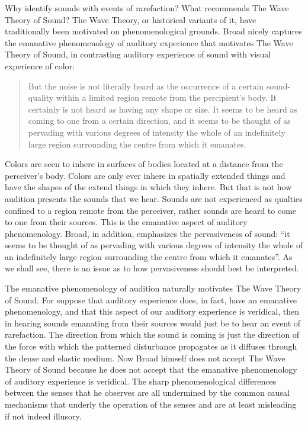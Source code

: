 \documentclass[12pt]{article}
\begin{document}
Why identify sounds with events of rarefaction? What recommends The Wave Theory of Sound? The Wave Theory, or historical variants of it, have traditionally been motivated on phenomenological grounds. Broad nicely captures the emanative phenomenology of auditory experience that motivates The Wave Theory of Sound, in contrasting auditory experience of sound with visual experience of color:
\begin{quote}
	But the noise is not literally heard as the occurrence of a certain sound-quality within a limited region remote from the percipient's body. It certainly is not heard as having any shape or size. It seems to be heard as coming to one from a certain direction, and it seems to be thought of as pervading with various degrees of intensity the whole of an indefinitely large region surrounding the centre from which it emanates. \citep[5]{Broad:1952kx}
\end{quote}
Colors are seen to inhere in surfaces of bodies located at a distance from the perceiver's body. Colors are only ever inhere in spatially extended things and have the shapes of the extend things in which they inhere. But that is not how audition presents the sounds that we hear. Sounds are not experienced as qualties confined to a region remote from the perceiver, rather sounds are heard to come to one from their sources. This is the emanative aspect of auditory phenomenology. Broad, in addition, emphasizes the pervasiveness of sound: ``it seems to be thought of as pervading with various degrees of intensity the whole of an indefinitely large region surrounding the centre from which it emanates''. As we shall see, there is an issue as to how pervasiveness should best be interpreted. 

The emanative phenomenology of audition naturally motivates The Wave Theory of Sound. For suppose that auditory experience does, in fact, have an emanative phenomenology, and that this aspect of our auditory experience is veridical, then in hearing sounds emanating from their sources would just be to hear an event of rarefaction. The direction from which the sound is coming is just the direction of the force with which the patterned disturbance propagates as it diffuses through the dense and elastic medium. Now Broad himself does not accept The Wave Theory of Sound because he does not accept that the emanative phenomenology of auditory experience is veridical. The sharp phenomenological differences between the senses that he observes are all undermined by the common causal mechanisms that underly the operation of the senses and are at least misleading if not indeed illusory. 
\end{document}
